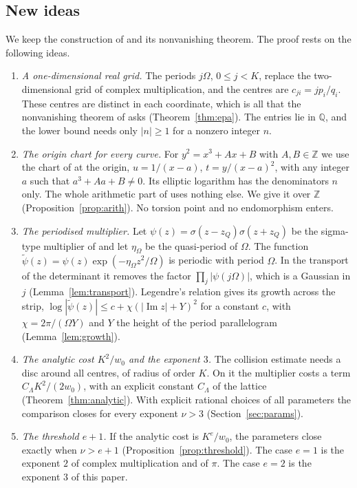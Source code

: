 \documentclass[11pt]{amsart}
\theoremstyle{definition}
\theoremstyle{remark}
\numberwithin{equation}{section}
\newcommand{\Z}{\mathbb Z}
\newcommand{\Q}{\mathbb Q}
\newcommand{\tpsi}{\widetilde\psi}
\newcommand{\CM}{\cite{ChudnovskyChudnovsky26}}
\begin{document}
\subsection{New ideas}
We keep the construction of \CM{} and its nonvanishing theorem. The proof rests on the following ideas.
\begin{enumerate}[leftmargin=*]
\item \emph{A one-dimensional real grid.} The periods $j\Omega$, $0\le j<K$, replace the two-dimensional grid of
 complex multiplication, and the centres are $c_{ji}=jp_i/q_i$. These centres are distinct in each coordinate,
 which is all that the nonvanishing theorem of \CM{} asks (Theorem~\ref{thm:epa}). The entries lie in $\Q$, and
 the lower bound needs only $|n|\ge1$ for a nonzero integer $n$.
\item \emph{The origin chart for every curve.} For $y^2=x^3+Ax+B$ with $A,B\in\Z$ we use the chart of \CM{} at
 the origin, $u=1/(x-a)$, $t=y/(x-a)^2$, with any integer $a$ such that $a^3+Aa+B\ne0$. Its elliptic logarithm
 has the denominators $n$ only. The whole arithmetic part of \CM{} uses nothing else. We give it over $\Z$
 (Proposition~\ref{prop:arith}). No torsion point and no endomorphism enters.
\item \emph{The periodised multiplier.} Let $\psi(z)=\sigma(z-z_Q)\sigma(z+z_Q)$ be the sigma-type multiplier of
 \CM{} and let $\eta_\Omega$ be the quasi-period of $\Omega$. The function
 $\tpsi(z)=\psi(z)\exp(-\eta_\Omega z^2/\Omega)$ is periodic with period $\Omega$. In the transport of the
 determinant it removes the factor $\prod_j|\psi(j\Omega)|$, which is a Gaussian in $j$
 (Lemma~\ref{lem:transport}). Legendre's relation gives its growth across the strip,
 $\log|\tpsi(z)|\le c+\chi(|\operatorname{Im}z|+Y)^2$ for a constant $c$, with $\chi=2\pi/(\Omega Y)$ and $Y$ the
 height of the period parallelogram (Lemma~\ref{lem:growth}).
\item \emph{The analytic cost $K^2/w_0$ and the exponent $3$.} The collision estimate needs a disc around all
 centres, of radius of order $K$. On it the multiplier costs a term $C_\Lambda K^2/(2w_0)$, with an explicit
 constant $C_\Lambda$ of the lattice (Theorem~\ref{thm:analytic}). With explicit rational choices of all
 parameters the comparison closes for every exponent $\nu>3$ (Section~\ref{sec:params}).
\item \emph{The threshold $e+1$.} If the analytic cost is $K^e/w_0$, the parameters close exactly when
 $\nu>e+1$ (Proposition~\ref{prop:threshold}). The case $e=1$ is the exponent $2$ of complex multiplication and
 of $\pi$. The case $e=2$ is the exponent $3$ of this paper.
\end{enumerate}
\end{document}
